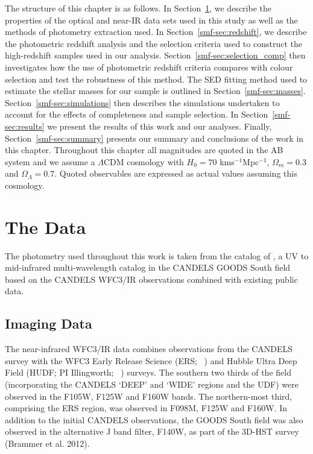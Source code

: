 The structure of this chapter is as follows. In Section~\ref{smf-sec:data}, we describe the properties of the optical and near-IR data sets used in this study as well as the methods of photometry extraction used. In Section~\ref{smf-sec:redshift}, we describe the photometric redshift analysis and the selection criteria used to construct the high-redshift samples used in our analysis. Section~\ref{smf-sec:selection_comp} then investigates how the use of photometric redshift criteria compares with colour selection and test the robustness of this method. The SED fitting method used to estimate the stellar masses for our sample is outlined in Section~\ref{smf-sec:masses}. Section~\ref{smf-sec:simulations} then describes the simulations undertaken to account for the effects of completeness and sample selection. In Section~\ref{smf-sec:results} we present the results of this work and our analyses. Finally, Section~\ref{smf-sec:summary} presents our summary and conclusions of the work in this chapter.
Throughout this chapter all magnitudes are quoted in the AB system \citep{1983ApJ...266..713O} and we assume a $\Lambda$CDM cosmology with $H_{0} = 70$ kms$^{-1}$Mpc$^{-1}$, $\Omega_{m}=0.3$ and $\Omega_{\Lambda}=0.7$. Quoted observables are expressed as actual values assuming this cosmology. 

\section{The Data}\label{smf-sec:data}
The photometry used throughout this work is taken from the catalog of \citet{Guo:2013ig}, a UV to mid-infrared multi-wavelength catalog in the CANDELS GOODS South field based on the CANDELS WFC3/IR observations combined with existing public data.

\subsection{Imaging Data}
The near-infrared WFC3/IR data combines observations from the CANDELS survey \citep{2011ApJS..197...35G,Koekemoer:2011br} with the WFC3 Early Release Science (ERS; \citeauthor{2011ApJS..193...27W}~\citeyear{2011ApJS..193...27W}) and Hubble Ultra Deep Field (HUDF; PI Illingworth; \citeauthor{Bouwens:2010dk}~\citeyear{Bouwens:2010dk}) surveys. The southern two thirds of the field (incorporating the CANDELS `DEEP' and `WIDE' regions and the UDF) were observed in the F105W, F125W and F160W bands. The northern-most third, comprising the ERS region, was observed in F098M, F125W and F160W. In addition to the initial CANDELS observations, the GOODS South field was also observed in the alternative J band filter, F140W, as part of the 3D-HST survey (Brammer et al. 2012).

